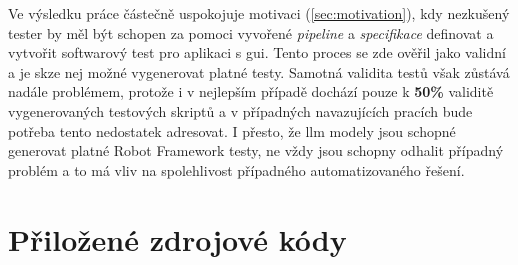 \documentclass[czech, ma, kiv, he, iso690numb, pdf, viewonly]{fasthesis}
\begin{document}
    Ve výsledku práce částečně uspokojuje motivaci (\ref{sec:motivation}), kdy nezkušený tester by měl být schopen za pomoci vyvořené \textit{pipeline} a \textit{specifikace} definovat a vytvořit softwarový test pro aplikaci s \Acrshort{gui}. Tento proces se zde ověřil jako validní a je skze nej možné vygenerovat platné testy. Samotná validita testů však zůstává nadále problémem, protože i v nejlepším případě dochází pouze k \textbf{50\%} validitě vygenerovaných testových skriptů a v případných navazujících pracích bude potřeba tento nedostatek adresovat. I přesto, že \Gls{llm} modely jsou schopné generovat platné Robot Framework testy, ne vždy jsou schopny odhalit případný problém a to má vliv na spolehlivost případného automatizovaného řešení.

\appendix

    \chapter{Přiložené zdrojové kódy} \label{sec:appendix:src}
\end{document}
